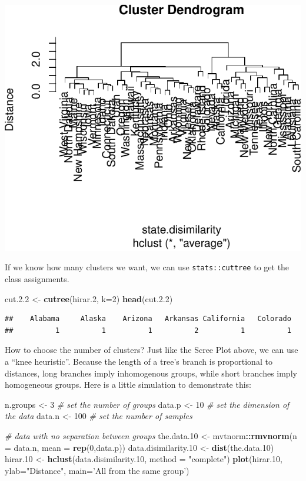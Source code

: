 \documentclass[]{book}
\newenvironment{Shaded}{\begin{snugshade}}{\end{snugshade}}
\newcommand{\CommentTok}[1]{\textcolor[rgb]{0.56,0.35,0.01}{\textit{#1}}}
\newcommand{\DataTypeTok}[1]{\textcolor[rgb]{0.13,0.29,0.53}{#1}}
\newcommand{\DecValTok}[1]{\textcolor[rgb]{0.00,0.00,0.81}{#1}}
\newcommand{\FloatTok}[1]{\textcolor[rgb]{0.00,0.00,0.81}{#1}}
\newcommand{\KeywordTok}[1]{\textcolor[rgb]{0.13,0.29,0.53}{\textbf{#1}}}
\newcommand{\NormalTok}[1]{#1}
\newcommand{\OperatorTok}[1]{\textcolor[rgb]{0.81,0.36,0.00}{\textbf{#1}}}
\newcommand{\StringTok}[1]{\textcolor[rgb]{0.31,0.60,0.02}{#1}}
\theoremstyle{definition}
\theoremstyle{definition}
\theoremstyle{definition}
\theoremstyle{remark}
\begin{document}
\includegraphics[width=0.5\linewidth]{Rcourse_files/figure-latex/average linkage-1}

If we know how many clusters we want, we can use \texttt{stats::cuttree} to get the class assignments.

\begin{Shaded}
\begin{Highlighting}[]
\NormalTok{cut.}\FloatTok{2.2}\NormalTok{ <-}\StringTok{ }\KeywordTok{cutree}\NormalTok{(hirar}\FloatTok{.2}\NormalTok{, }\DataTypeTok{k=}\DecValTok{2}\NormalTok{)}
\KeywordTok{head}\NormalTok{(cut.}\FloatTok{2.2}\NormalTok{)}
\end{Highlighting}
\end{Shaded}

\begin{verbatim}
##    Alabama     Alaska    Arizona   Arkansas California   Colorado 
##          1          1          1          2          1          1
\end{verbatim}

How to choose the number of clusters?
Just like the Scree Plot above, we can use a ``knee heuristic''.
Because the length of a tree's branch is proportional to distances, long branches imply inhomogenous groups, while short branches imply homogeneous groups.
Here is a little simulation to demonstrate this:

\begin{Shaded}
\begin{Highlighting}[]
\NormalTok{n.groups <-}\StringTok{ }\DecValTok{3} \CommentTok{# set the number of groups}
\NormalTok{data.p <-}\StringTok{ }\DecValTok{10} \CommentTok{# set the dimension of the data}
\NormalTok{data.n <-}\StringTok{ }\DecValTok{100} \CommentTok{# set the number of samples}

\CommentTok{# data with no separation between groups}
\NormalTok{the.data}\FloatTok{.10}\NormalTok{ <-}\StringTok{ }\NormalTok{mvtnorm}\OperatorTok{::}\KeywordTok{rmvnorm}\NormalTok{(}\DataTypeTok{n =}\NormalTok{ data.n, }\DataTypeTok{mean =} \KeywordTok{rep}\NormalTok{(}\DecValTok{0}\NormalTok{,data.p))  }
\NormalTok{data.disimilarity}\FloatTok{.10}\NormalTok{ <-}\StringTok{ }\KeywordTok{dist}\NormalTok{(the.data}\FloatTok{.10}\NormalTok{)}
\NormalTok{hirar}\FloatTok{.10}\NormalTok{ <-}\StringTok{ }\KeywordTok{hclust}\NormalTok{(data.disimilarity}\FloatTok{.10}\NormalTok{, }\DataTypeTok{method =} \StringTok{"complete"}\NormalTok{)}
\KeywordTok{plot}\NormalTok{(hirar}\FloatTok{.10}\NormalTok{, }\DataTypeTok{ylab=}\StringTok{"Distance"}\NormalTok{, }\DataTypeTok{main=}\StringTok{'All from the same group'}\NormalTok{)}
\end{Highlighting}
\end{Shaded}
\end{document}
